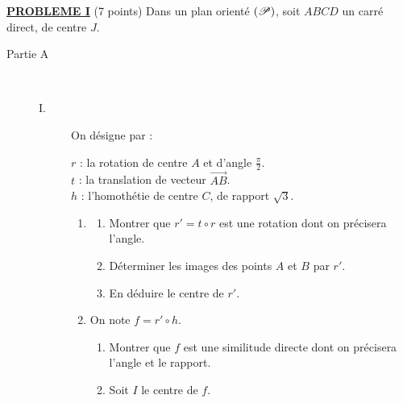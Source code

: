 \noindent \underline{\textsc{\textbf{PROBLEME I}}} (7 points) \newline
      Dans un plan orient\'e $(\mathscr{P})$, soit $ABCD$ un carr\'e direct, de centre $J$.
      \begin{description}
            \item[Partie A]~\newline
                  \begin{description}
                        \item[I. ]
                              On d\'esigne par : 
                                    \begin{mitanisa}
                                          $r$ : la rotation de centre $A$ et d'angle $\frac{\pi}{2}$. \\
                                          $t$ : la translation de vecteur $\overrightarrow{AB}$. \\
                                          $h$ : l'homoth\'etie de centre $C$, de rapport $\sqrt{3}$.
                                    \end{mitanisa}
                              \begin{enumerate}
                                    \item \begin{enumerate}
                                                \item Montrer que $r' = t \circ r$ est une rotation dont on pr\'ecisera l'angle.
                                                \item D\'eterminer les images des points $A$ et $B$ par $r'$.
                                                \item En d\'eduire le centre de $r'$.
                                          \end{enumerate}
                                    \item On note $f = r' \circ h$.
                                          \begin{enumerate}
                                                \item Montrer que $f$ est une similitude directe 
                                                      dont on pr\'ecisera l'angle et le rapport.
                                                \item Soit $I$ le centre de $f$.

\end{enumerate}
\end{enumerate}
\end{description}
\end{description}
